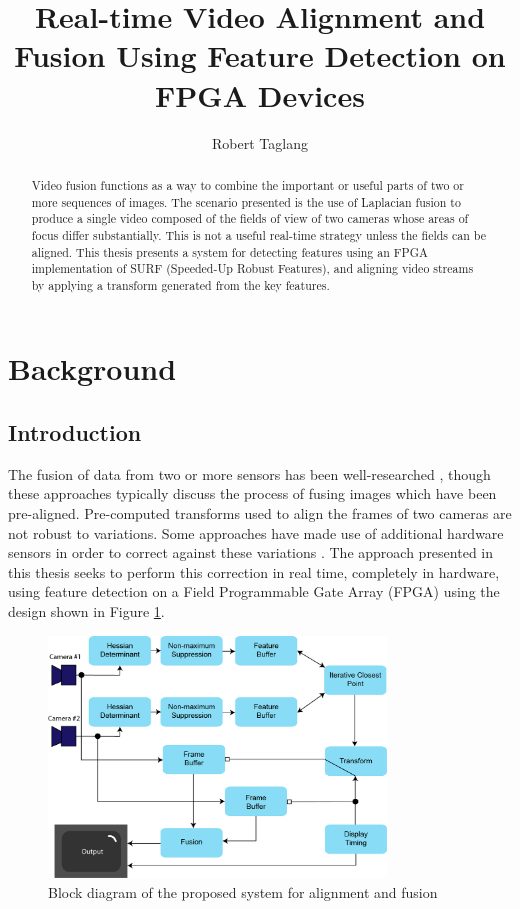 \documentclass[sigconf]{acmart/acmart}
\title{Real-time Video Alignment and Fusion Using Feature Detection on FPGA Devices}
\author{Robert Taglang}
\begin{document}
\begin{abstract}
    Video fusion functions as a way to combine the important or useful parts of two or more sequences of images. The scenario presented is the use of Laplacian fusion to produce a single video composed of the fields of view of two cameras whose areas of focus differ substantially. This is not a useful real-time strategy unless the fields can be aligned. This thesis presents a system for detecting features using an FPGA implementation of SURF (Speeded-Up Robust Features), and aligning video streams by applying a transform generated from the key features. 
\end{abstract}

\section{Background}

\subsection{Introduction}

The fusion of data from two or more sensors has been well-researched \cite{wang_multi-focus_2011} \cite{li_multi-sensor_1994}, though these approaches typically discuss the process of fusing images which have been pre-aligned. Pre-computed transforms used to align the frames of two cameras are not robust to variations. Some approaches have made use of additional hardware sensors in order to correct against these variations \cite{chappell_exploiting_2006}. The approach presented in this thesis seeks to perform this correction in real time, completely in hardware, using feature detection on a Field Programmable Gate Array (FPGA) using the design shown in Figure \ref{fig_block_diagram}.

\begin{figure}[h]
	\centering
	\includegraphics[width=0.8\textwidth]{figures/block/blockdiagram}
	\caption{Block diagram of the proposed system for alignment and fusion}
	\label{fig_block_diagram}
\end{figure}
\end{document}
